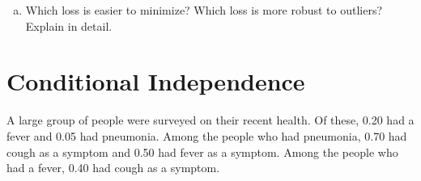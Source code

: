 \documentclass[11pt]{article}
\begin{document}
\begin{enumerate}[(a)]
\begin{answertext}{11cm}{}
\end{answertext} 

\item Which loss is easier to minimize?  Which loss is more robust to outliers?  Explain in detail.\\
\begin{answertext}{9cm}{}


  
\end{answertext} 

\end{enumerate}

\pagebreak
\section{Conditional Independence}
A large group of people were surveyed on their recent health. Of these, 0.20 had a fever and 0.05 had pneumonia. Among the people who had pneumonia, 0.70 had cough as a symptom and 0.50 had fever as a symptom. Among the people who had a fever, 0.40 had cough as a symptom.
\end{document}

